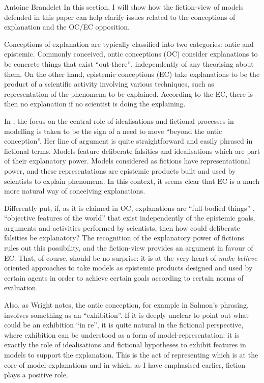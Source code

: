 \begin{artengenv}{Antoine Brandelet}
In this section, I will show how the fiction-view of models defended in this paper can help clarify issues related to the conceptions of explanation and the OC/EC opposition.

Conceptions of explanation are typically classified into two categories: ontic and epistemic. Commonly conceived, ontic conceptions (OC) consider explanations to be concrete things that exist ``out-there'', independently of any theorising about them. On the other hand, epistemic conceptions (EC) take explanations to be the product of a scientific activity involving various techniques, such as representation of the phenomena to be explained. According to the EC, there is then no explanation if no scientist is doing the explaining.

In \parencite{Bokulich2016}, the focus on the central role of idealisations and fictional processes in modelling is taken to be the sign of a need to move ``beyond the ontic conception''. Her line of argument is quite straightforward and easily phrased in fictional terms. Models feature deliberate falsities and idealisations which are part of their explanatory power. Models considered as fictions have representational power, and these representations are epistemic products built and used by scientists to explain phenomena. In this context, it seems clear that EC is a much more natural way of conceiving explanations.

Differently put, if, as it is claimed in OC, explanations are ``full-bodied things'' \parencite[p.40]{Craver2014}, ``objective features of the world'' \parencite[p.27]{Craver2007} that exist independently of the epistemic goals, arguments and activities performed by scientists, then how could deliberate falsities be explanatory? The recognition of the explanatory power of fictions rules out this possibility, and the fiction-view provides an argument in favour of EC. That, of course, should be no surprise: it is at the very heart of \textit{make-believe} oriented approaches to take models as epistemic products designed and used by certain agents in order to achieve certain goals according to certain norms of evaluation.

Also, as Wright \parencite*{Wright2015} notes, the ontic conception, for example in Salmon's phrasing, involves something as an ``exhibition''. If it is deeply unclear to point out what could be an exhibition ``in re'', it is quite natural in the fictional perspective, where exhibition can be understood as a form of model-representation: it is exactly the role of idealisations and fictional hypotheses to exhibit features in models to support the explanation. This is the act of representing which is at the core of model-explanations and in which, as I have emphasised earlier, fiction plays a positive role.


\end{artengenv}
